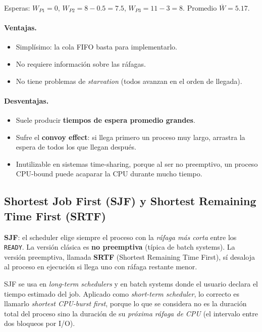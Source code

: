 \documentclass[11pt,a4paper]{article}
\begin{document}
Esperas: $W_{P1} = 0$, $W_{P2} = 8 - 0.5 = 7.5$, $W_{P3} = 11 - 3 = 8$.
Promedio $\overline{W} = 5.17$.

\paragraph{Ventajas.}
\begin{itemize}[leftmargin=*,nosep]
    \item Simplísimo: la cola FIFO basta para implementarlo.
    \item No requiere información sobre las ráfagas.
    \item No tiene problemas de \emph{starvation} (todos avanzan en
        el orden de llegada).
\end{itemize}

\paragraph{Desventajas.}
\begin{itemize}[leftmargin=*,nosep]
    \item Suele producir \textbf{tiempos de espera promedio grandes}.
    \item Sufre el \textbf{convoy effect}: si llega primero un proceso
        muy largo, arrastra la espera de todos los que llegan después.
    \item Inutilizable en sistemas time-sharing, porque al ser no
        preemptivo, un proceso CPU-bound puede acaparar la CPU
        durante mucho tiempo.
\end{itemize}

\subsection{Shortest Job First (SJF) y Shortest Remaining Time First (SRTF)}

\begin{definicion}
\textbf{SJF}: el scheduler elige siempre el proceso con la
\emph{ráfaga más corta} entre los \texttt{READY}. La versión clásica
es \textbf{no preemptiva} (típica de batch systems). La versión
preemptiva, llamada \textbf{SRTF} (Shortest Remaining Time First), sí
desaloja al proceso en ejecución si llega uno con ráfaga restante
menor.
\end{definicion}

SJF se usa en \emph{long-term schedulers} y en batch systems donde el
usuario declara el tiempo estimado del job. Aplicado como
\emph{short-term scheduler}, lo correcto es llamarlo \emph{shortest
CPU-burst first}, porque lo que se considera no es la duración total
del proceso sino la duración de su \emph{próxima ráfaga de CPU} (el
intervalo entre dos bloqueos por I/O).
\end{document}
